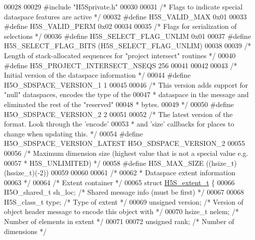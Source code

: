 \begin{DoxyCode}
00028 
00029 \textcolor{preprocessor}{#include "H5Sprivate.h"}
00030 
00031 \textcolor{comment}{/* Flags to indicate special dataspace features are active */}
00032 \textcolor{preprocessor}{#define H5S\_VALID\_MAX   0x01}
00033 \textcolor{preprocessor}{#define H5S\_VALID\_PERM  0x02}
00034 
00035 \textcolor{comment}{/* Flags for serialization of selections */}
00036 \textcolor{preprocessor}{#define H5S\_SELECT\_FLAG\_UNLIM   0x01}
00037 \textcolor{preprocessor}{#define H5S\_SELECT\_FLAG\_BITS    (H5S\_SELECT\_FLAG\_UNLIM)}
00038 
00039 \textcolor{comment}{/* Length of stack-allocated sequences for "project intersect" routines */}
00040 \textcolor{preprocessor}{#define H5S\_PROJECT\_INTERSECT\_NSEQS 256}
00041 
00042 
00043 \textcolor{comment}{/* Initial version of the dataspace information */}
00044 \textcolor{preprocessor}{#define H5O\_SDSPACE\_VERSION\_1   1}
00045 
00046 \textcolor{comment}{/* This version adds support for "null" dataspaces, encodes the type of the}
00047 \textcolor{comment}{ *      dataspace in the message and eliminated the rest of the "reserved"}
00048 \textcolor{comment}{ *      bytes.}
00049 \textcolor{comment}{ */}
00050 \textcolor{preprocessor}{#define H5O\_SDSPACE\_VERSION\_2   2}
00051 
00052 \textcolor{comment}{/* The latest version of the format.  Look through the 'encode'}
00053 \textcolor{comment}{ *      and 'size' callbacks for places to change when updating this. */}
00054 \textcolor{preprocessor}{#define H5O\_SDSPACE\_VERSION\_LATEST H5O\_SDSPACE\_VERSION\_2}
00055 
00056 \textcolor{comment}{/* Maximum dimension size (highest value that is not a special value e.g.}
00057 \textcolor{comment}{ * H5S\_UNLIMITED) */}
00058 \textcolor{preprocessor}{#define H5S\_MAX\_SIZE            ((hsize\_t)(hssize\_t)(-2))}
00059 
00060 
00061 \textcolor{comment}{/*}
00062 \textcolor{comment}{ * Dataspace extent information}
00063 \textcolor{comment}{ */}
00064 \textcolor{comment}{/* Extent container */}
00065 \textcolor{keyword}{struct }\hyperlink{struct_h5_s__extent__t}{H5S\_extent\_t} \{
00066     H5O\_shared\_t sh\_loc;        \textcolor{comment}{/* Shared message info (must be first) */}
00067 
00068     H5S\_class\_t type;           \textcolor{comment}{/* Type of extent */}
00069     \textcolor{keywordtype}{unsigned} version;           \textcolor{comment}{/* Version of object header message to encode this object with */}
00070     hsize\_t nelem;              \textcolor{comment}{/* Number of elements in extent */}
00071 
00072     \textcolor{keywordtype}{unsigned} rank;              \textcolor{comment}{/* Number of dimensions */}

\end{DoxyCode}
